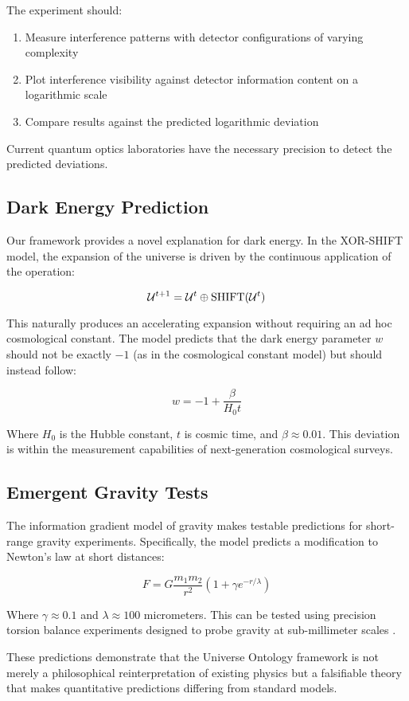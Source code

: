 The experiment should:
\begin{enumerate}
    \item Measure interference patterns with detector configurations of varying complexity
    \item Plot interference visibility against detector information content on a logarithmic scale
    \item Compare results against the predicted logarithmic deviation
\end{enumerate}

Current quantum optics laboratories have the necessary precision to detect the predicted deviations.

\subsection{Dark Energy Prediction}

Our framework provides a novel explanation for dark energy. In the XOR-SHIFT model, the expansion of the universe is driven by the continuous application of the operation:

\begin{equation}
\mathcal{U}^{t+1} = \mathcal{U}^t \oplus \text{SHIFT}(\mathcal{U}^t)
\end{equation}

This naturally produces an accelerating expansion without requiring an ad hoc cosmological constant. The model predicts that the dark energy parameter $w$ should not be exactly $-1$ (as in the cosmological constant model) but should instead follow:

\begin{equation}
w = -1 + \frac{\beta}{H_0 t}
\end{equation}

Where $H_0$ is the Hubble constant, $t$ is cosmic time, and $\beta \approx 0.01$. This deviation is within the measurement capabilities of next-generation cosmological surveys.

\subsection{Emergent Gravity Tests}

The information gradient model of gravity makes testable predictions for short-range gravity experiments. Specifically, the model predicts a modification to Newton's law at short distances:

\begin{equation}
F = G\frac{m_1 m_2}{r^2}\left(1 + \gamma e^{-r/\lambda}\right)
\end{equation}

Where $\gamma \approx 0.1$ and $\lambda \approx 100$ micrometers. This can be tested using precision torsion balance experiments designed to probe gravity at sub-millimeter scales \cite{Jacobson1995}.

These predictions demonstrate that the Universe Ontology framework is not merely a philosophical reinterpretation of existing physics but a falsifiable theory that makes quantitative predictions differing from standard models.
